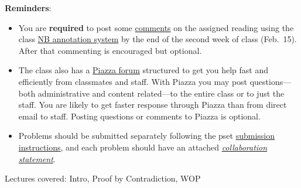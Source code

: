 \documentclass[handout]{mcs}
\begin{document}
\renewcommand{\reading}{
Part~\bref{part:proofs}{. \emph{Proofs:
      Introduction}}; Chapter~\bref{proofs_chap}{.\ \emph{What is a
      Proof?}}; Chapter~\bref{well_ordering_chap}{.\ \emph{The Well
      Ordering Principle}}; and Chapter~\bref{logicform_chap}{ through
    \bref{SAT_sec}{, covering \emph{Propositional Logic}}}.  These
  assigned readings do \textbf{not} include the Problem sections.  (Many
  of the problems in the text will appear as class or homework problems.)}


\medskip

\textbf{Reminders}:
\begin{itemize}
\item 
  You are \textbf{required} to post some
  \href{http://courses.csail.mit.edu/6.042/spring13/courseinfo#comments}{comments}
  on the assigned reading using the class
  \href{http://nb.csail.mit.edu}{NB annotation system} by the end of
  the second week of class (Feb.\ 15).  After that commenting is
  encouraged but optional.

\item The class also has a
  \href{http://piazza.com/mit/spring2013/6042j18062j/home}{Piazza
    forum} structured to get you help fast and efficiently from
  classmates and staff.  With Piazza you may post questions---both
  administrative and content related---to the entire class or to just
  the staff.  You are likely to get faster response through Piazza
  than from direct email to staff.  Posting questions or comments to
  Piazza is optional.

\item Problems should be submitted separately following the pset
  \href{http://courses.csail.mit.edu/6.042/spring13/submission.shtml}
       {submission instructions}, and each problem should have an attached
  \href{http://courses.csail.mit.edu/6.042/spring13/submission_template.pdf}
       {\emph{collaboration statement}}.

 \end{itemize}

\begin{staffnotes}
Lectures covered: Intro, Proof by Contradiction, WOP
\end{staffnotes}



\end{document}
